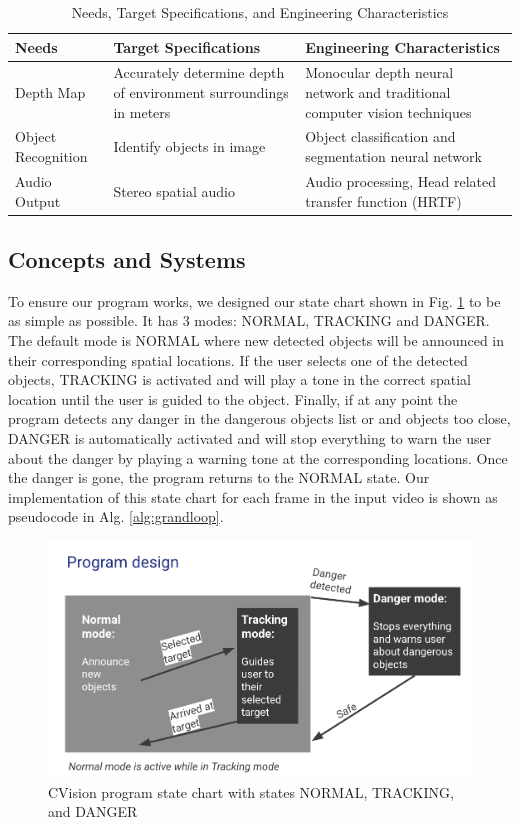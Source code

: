\documentclass[12pt,a4paper]{article}
\begin{document}
  \begin{table}[htbp]
    \centering
    \caption{Needs, Target Specifications, and Engineering Characteristics}
    \label{tab:needs_specs}
    \begin{tabularx}{\textwidth}{|l|X|X|}
    \hline
    \textbf{Needs} & \textbf{Target Specifications} & \textbf{Engineering Characteristics} \\
    \hline
    Depth Map & Accurately determine depth of environment surroundings in meters & Monocular depth neural network and traditional computer vision techniques \\
    \hline
    Object Recognition & Identify objects in image & Object classification and segmentation neural network \\
    \hline
    Audio Output & Stereo spatial audio & Audio processing, Head related transfer function (HRTF) \\
    \hline
    \end{tabularx}
    \end{table}

\newpage
\subsection{Concepts and Systems}
To ensure our program works, we designed our state chart shown in Fig. \ref{states} to be as simple as possible.
It has 3 modes: NORMAL, TRACKING and DANGER.
The default mode is NORMAL where new detected objects will be announced in their corresponding spatial locations.
If the user selects one of the detected objects, TRACKING is activated and will play a tone in the correct spatial location until the user is guided to the object.
Finally, if at any point the program detects any danger in the dangerous objects list or and objects too close, DANGER is automatically activated and will stop everything to warn the user about the danger by playing a warning tone at the corresponding locations.
Once the danger is gone, the program returns to the NORMAL state.
Our implementation of this state chart for each frame in the input video is shown as pseudocode in Alg. \ref{alg:grandloop}.
\begin{figure}[ht!]
    \center
    \includegraphics[width=1\linewidth]{state_diagram.png}
    \caption{CVision program state chart with states NORMAL, TRACKING, and DANGER}
    \label{states}
  \end{figure}
  \newpage
\end{document}
